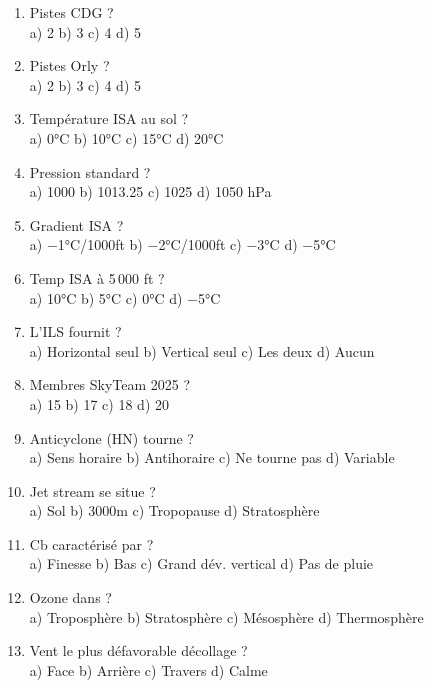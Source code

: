 \begin{enumerate}[nosep, start=61]
\item Pistes CDG ? \\ a) 2 \quad b) 3 \quad c) 4 \quad d) 5

\item Pistes Orly ? \\ a) 2 \quad b) 3 \quad c) 4 \quad d) 5

\item Température ISA au sol ? \\ a) 0°C \quad b) 10°C \quad c) 15°C \quad d) 20°C

\item Pression standard ? \\ a) 1000 \quad b) 1013.25 \quad c) 1025 \quad d) 1050 hPa

\item Gradient ISA ? \\ a) $-$1°C/1000ft \quad b) $-$2°C/1000ft \quad c) $-$3°C \quad d) $-$5°C

\item Temp ISA à 5\,000 ft ? \\ a) 10°C \quad b) 5°C \quad c) 0°C \quad d) $-$5°C

\item L'ILS fournit ? \\ a) Horizontal seul \quad b) Vertical seul \quad c) Les deux \quad d) Aucun

\item Membres SkyTeam 2025 ? \\ a) 15 \quad b) 17 \quad c) 18 \quad d) 20

\item Anticyclone (HN) tourne ? \\ a) Sens horaire \quad b) Antihoraire \quad c) Ne tourne pas \quad d) Variable

\item Jet stream se situe ? \\ a) Sol \quad b) 3000m \quad c) Tropopause \quad d) Stratosphère

\item Cb caractérisé par ? \\ a) Finesse \quad b) Bas \quad c) Grand dév. vertical \quad d) Pas de pluie

\item Ozone dans ? \\ a) Troposphère \quad b) Stratosphère \quad c) Mésosphère \quad d) Thermosphère

\item Vent le plus défavorable décollage ? \\ a) Face \quad b) Arrière \quad c) Travers \quad d) Calme


\end{enumerate}
